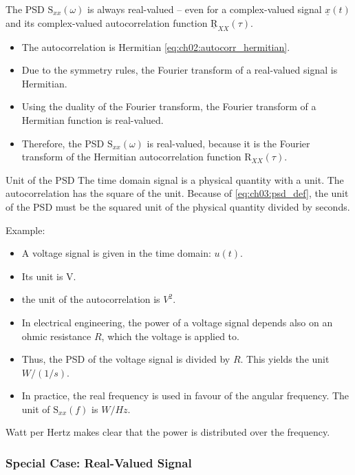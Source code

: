 \begin{refsection}
The \ac{PSD} $\mathrm{S}_{xx}(\omega)$ is always real-valued -- even for a complex-valued signal $\underline{x}(t)$ and its complex-valued autocorrelation function $\underline{\mathrm{R}}_{XX}(\tau)$.
\begin{itemize}
	\item The autocorrelation is Hermitian \eqref{eq:ch02:autocorr_hermitian}.
	\item Due to the symmetry rules, the Fourier transform of a real-valued signal is Hermitian.
	\item Using the duality of the Fourier transform, the Fourier transform of a Hermitian function is real-valued.
	\item Therefore, the \ac{PSD} $\mathrm{S}_{xx}(\omega)$ is real-valued, because it is the Fourier transform of the Hermitian autocorrelation function $\mathrm{R}_{XX}(\tau)$.
\end{itemize}

\begin{excursus}{Unit of the \ac{PSD}}
	The time domain signal is a physical quantity with a unit. The autocorrelation has the square of the unit. Because of \eqref{eq:ch03:psd_def}, the unit of the \ac{PSD} must be the squared unit of the physical quantity divided by seconds.
	
	Example:
	\begin{itemize}
		\item A voltage signal is given in the time domain: $u(t)$.
		\item Its unit is \si{V}.
		\item the unit of the autocorrelation is $\si{V^2}$.
		\item In electrical engineering, the power of a voltage signal depends also on an ohmic resistance $R$, which the voltage is applied to.
		\item Thus, the \ac{PSD} of the voltage signal is divided by $R$. This yields the unit $\si{W/(1/s)}$.
		\item In practice, the real frequency is used in favour of the angular frequency. The unit of $\mathrm{S}_{xx}(f)$ is $\si{W/Hz}$.
	\end{itemize}
	Watt per Hertz makes clear that the power is distributed over the frequency.
\end{excursus}

\subsubsection{Special Case: Real-Valued Signal}


\end{refsection}
